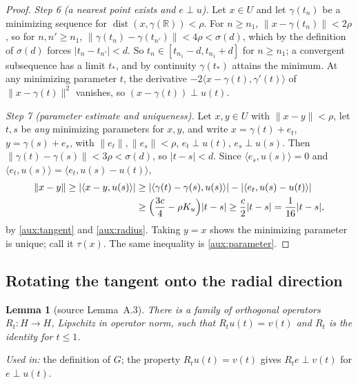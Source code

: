 \documentclass[11pt]{article}
\newcommand{\R}{\mathbb R}
\newcommand{\norm}[1]{\lVert #1\rVert}
\newcommand{\ip}[2]{\langle #1,#2\rangle}
\DeclareMathOperator{\dist}{dist}
\newtheorem{lemma}[theorem]{Lemma}
\theoremstyle{definition}
\numberwithin{equation}{section}
\begin{document}
\begin{proof}
\emph{Step 6 (a nearest point exists and \(e\perp u\)).} Let \(x\in U\)
and let \(\gamma(t_n)\) be a minimizing sequence for
\(\dist(x,\gamma(\R))<\rho\). For \(n\ge n_1\),
\(\norm{x-\gamma(t_n)}<2\rho\), so for \(n,n'\ge n_1\),
\(\norm{\gamma(t_n)-\gamma(t_{n'})}<4\rho<\sigma(d)\), which by the
definition of \(\sigma(d)\) forces \(|t_n-t_{n'}|<d\). So
\(t_n\in[t_{n_1}-d,t_{n_1}+d]\) for \(n\ge n_1\); a convergent
subsequence has a limit \(t_*\), and by continuity \(\gamma(t_*)\)
attains the minimum. At any minimizing parameter \(t\), the derivative
\(-2\ip{x-\gamma(t)}{\gamma'(t)}\) of \(\norm{x-\gamma(t)}^2\) vanishes,
so \((x-\gamma(t))\perp u(t)\).

\emph{Step 7 (parameter estimate and uniqueness).} Let \(x,y\in U\) with
\(\norm{x-y}<\rho\), let \(t,s\) be \emph{any} minimizing parameters for
\(x,y\), and write \(x=\gamma(t)+e_t\), \(y=\gamma(s)+e_s\), with
\(\norm{e_t},\norm{e_s}<\rho\), \(e_t\perp u(t)\), \(e_s\perp u(s)\).
Then \(\norm{\gamma(t)-\gamma(s)}<3\rho<\sigma(d)\), so \(|t-s|<d\).
Since \(\ip{e_s}{u(s)}=0\) and
\(\ip{e_t}{u(s)}=\ip{e_t}{u(s)-u(t)}\),
\begin{align*}
 \norm{x-y}\ge|\ip{x-y}{u(s)}|
 &\ge |\ip{\gamma(t)-\gamma(s)}{u(s)}|
       -|\ip{e_t}{u(s)-u(t)}|\\
 &\ge\Bigl(\frac{3c}{4}-\rho K_u\Bigr)|t-s|
 \ge\frac c2|t-s|=\frac{1}{16}|t-s| ,
\end{align*}
by \eqref{aux:tangent} and \eqref{aux:radius}. Taking \(y=x\) shows the
minimizing parameter is unique; call it \(\tau(x)\). The same inequality
is \eqref{aux:parameter}.
\end{proof}

\subsection{Rotating the tangent onto the radial direction}

\begin{lemma}[source Lemma~A.3]\label{aux:rotation}
There is a family of orthogonal operators \(R_t:H\to H\), Lipschitz in
operator norm, such that \(R_tu(t)=v(t)\) and \(R_t\) is the identity for
\(t\le1\).
\end{lemma}
\noindent\emph{Used in:} the definition of \(G\); the property
\(R_tu(t)=v(t)\) gives \(R_te\perp v(t)\) for \(e\perp u(t)\).
\end{document}
